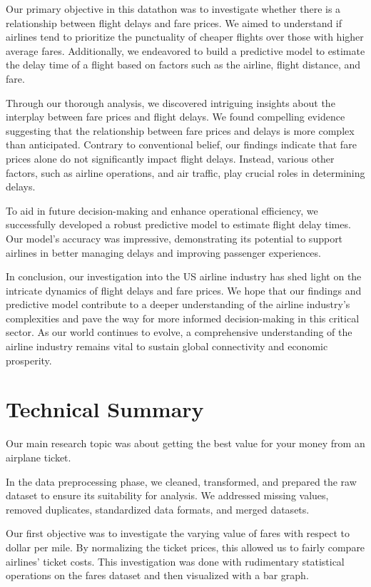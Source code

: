 \documentclass{article}
\begin{document}
Our primary objective in this datathon was to investigate whether there is a relationship between flight delays and fare prices. We aimed to understand if airlines tend to prioritize the punctuality of cheaper flights over those with higher average fares. Additionally, we endeavored to build a predictive model to estimate the delay time of a flight based on factors such as the airline, flight distance, and fare.

Through our thorough analysis, we discovered intriguing insights about the interplay between fare prices and flight delays. We found compelling evidence suggesting that the relationship between fare prices and delays is more complex than anticipated. Contrary to conventional belief, our findings indicate that fare prices alone  do not significantly impact flight delays. Instead, various other factors, such as airline operations, and air traffic, play crucial roles in determining delays.

To aid in future decision-making and enhance operational efficiency, we successfully developed a robust predictive model to estimate flight delay times. Our model's accuracy was impressive, demonstrating its potential to support airlines in better managing delays and improving passenger experiences.

In conclusion, our investigation into the US airline industry has shed light on the intricate dynamics of flight delays and fare prices. We hope that our findings and predictive model contribute to a deeper understanding of the airline industry's complexities and pave the way for more informed decision-making in this critical sector. As our world continues to evolve, a comprehensive understanding of the airline industry remains vital to sustain global connectivity and economic prosperity.

\section{Technical Summary}

Our main research topic was about getting the best value for your money from an airplane ticket. 

In the data preprocessing phase, we cleaned, transformed, and prepared the raw dataset to ensure its suitability for analysis. We addressed missing values, removed duplicates, standardized data formats, and merged datasets. 

Our first objective was to investigate the varying value of fares with respect to dollar per mile. By normalizing the ticket prices, this allowed us to fairly compare airlines' ticket costs. This investigation was done with rudimentary statistical operations on the fares dataset and then visualized with a bar graph. 
\end{document}

